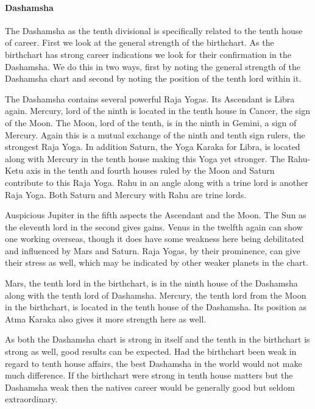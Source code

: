  

\paragraph{Dashamsha}

The Dashamsha as the tenth divisional is specifically related to the tenth house of career. First we look at the general strength of the birthchart. As the birthchart has strong career indications we look for their confirmation in the Dashamsha. We do this in two ways, first by noting the general strength of the Dashamsha chart and second by noting the position of the tenth lord within it.

 

The Dashamsha contains several powerful Raja Yogas. Its Ascendant is Libra again. Mercury, lord of the ninth is located in the tenth house in Cancer, the sign of the Moon. The Moon, lord of the tenth, is in the ninth in Gemini, a sign of Mercury. Again this is a mutual exchange of the ninth and tenth sign rulers, the strongest Raja Yoga. In addition Saturn, the Yoga Karaka for Libra, is located along with Mercury in the tenth house making this Yoga yet stronger. The Rahu-Ketu axis in the tenth and fourth houses ruled by the Moon and Saturn contribute to this Raja Yoga. Rahu in an angle along with a trine lord is another Raja Yoga. Both Saturn and Mercury with Rahu are trine lords.

 

Auspicious Jupiter in the fifth aspects the Ascendant and the Moon. The Sun as the eleventh lord in the second gives gains. Venus in the twelfth again can show one working overseas, though it does have some weakness here being debilitated and influenced by Mars and Saturn. Raja Yogas, by their prominence, can give their stress as well, which may be indicated by other weaker planets in the chart.

 

Mars, the tenth lord in the birthchart, is in the ninth house of the Dashamsha along with the tenth lord of Dashamsha. Mercury, the tenth lord from the Moon in the birthchart, is located in the tenth house of the Dashamsha. Its position as Atma Karaka also gives it more strength here as well.

 

As both the Dashamsha chart is strong in itself and the tenth in the birthchart is strong as well, good results can be expected. Had the birthchart been weak in regard to tenth house affairs, the best Dashamsha in the world would not make much difference. If the birthchart were strong in tenth house matters but the Dashamsha weak then the natives career would be generally good but seldom extraordinary.

